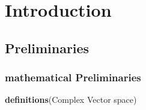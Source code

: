 \chapter{Introduction}

%
%
%

\section{ Preliminaries }

\subsection{ mathematical Preliminaries }


 \textbf{definitions}{(Complex Vector space)}

